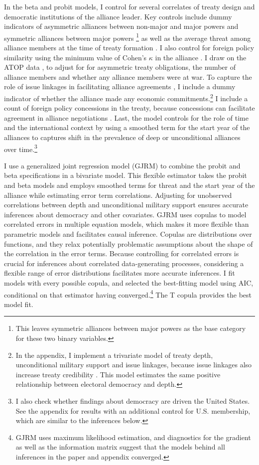 \documentclass[12pt]{article}
\begin{document}
In the beta and probit models, I control for several correlates of treaty design and democratic institutions of the alliance leader. 
Key controls include dummy indicators of asymmetric alliances between non-major and major powers and symmetric alliances between major powers \citep{Mattes2012}\footnote{This leaves symmetric alliances between major powers as the base category for these two binary variables.} as well as the average threat among alliance members at the time of treaty formation \citep{LeedsSavun2007}. 
I also control for foreign policy similarity using the minimum value of Cohen's $\kappa$ in the alliance \citep{Hage2011}.
I draw on the ATOP data \citep{Leedsetal2002}, to adjust for for asymmetric treaty obligations, the number of alliance members and whether any alliance members were at war. 
To capture the role of issue linkages in facilitating alliance agreements \citep{Poast2012}, I include a dummy indicator of whether the alliance made any economic commitments.\footnote{In the appendix, I implement a trivariate model of treaty depth, unconditional military support and issue linkages, because issue linkages also increase treaty credibility \citep{ Poast2013}. This model estimates the same positive relationship between electoral democracy and depth.}  
I include a count of foreign policy concessions in the treaty, because concessions can facilitate agreement in alliance negotiations \citep{Johnson2015}. 
Last, the model controls for the role of time and the international context by using a smoothed term for the start year of the alliances to captures shift in the prevalence of deep or unconditional alliances over time.\footnote{I also check whether findings about democracy are driven the United States. See the appendix for results with an additional control for U.S. membership, which are similar to the inferences below.}


I use a generalized joint regression model (GJRM) \citep{Braumoelleretal2018} to combine the probit and beta specifications in a bivariate model.
This flexible estimator takes the probit and beta models and employs smoothed terms for threat and the start year of the alliance while estimating error term correlations. 
Adjusting for unobserved correlations between depth and unconditional military support ensures accurate inferences about democracy and other covariates.
GJRM uses copulas to model correlated errors in multiple equation models, which makes it more flexible than parametric models and facilitates causal inference. 
Copulas are distributions over functions, and they relax potentially problematic assumptions about the shape of the correlation in the error terms. 
Because controlling for correlated errors is crucial for inferences about correlated data-generating processes, considering a flexible range of error distributions facilitates more accurate inferences. 
I fit models with every possible copula, and selected the best-fitting model using AIC, conditional on that estimator having converged.\footnote{GJRM uses maximum likelihood estimation, and diagnostics for the gradient as well as the information matrix suggest that the models behind all inferences in the paper and appendix converged.} 
The T copula provides the best model fit. 
\end{document}
